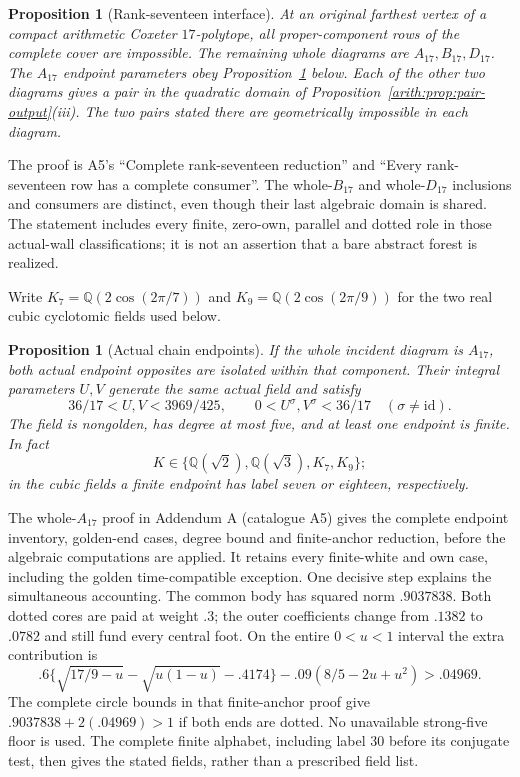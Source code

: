\documentclass[11pt]{article}
\newtheorem{proposition}[theorem]{Proposition}
\theoremstyle{remark}\newtheorem{remark}[theorem]{Remark}
\numberwithin{equation}{section}
\newcommand{\Q}{\mathbb Q}
\begin{document}
\begin{proposition}[Rank-seventeen interface]\label{arith:prop:f17}
At an original farthest vertex of a compact arithmetic Coxeter
$17$-polytope, all proper-component rows of the complete cover are
impossible. The remaining whole diagrams are $A_{17},B_{17},D_{17}$.
The $A_{17}$ endpoint parameters obey Proposition~\ref{arith:prop:a17reduce}
below. Each of the other two diagrams gives a pair in the quadratic
domain of Proposition~\ref{arith:prop:pair-output}(iii).
The two pairs stated there are geometrically impossible in each diagram.
\end{proposition}
The proof is A5's ``Complete rank-seventeen reduction'' and ``Every
rank-seventeen row has a complete consumer''. The whole-$B_{17}$ and
whole-$D_{17}$ inclusions and consumers are distinct, even though their
last algebraic domain is shared. The statement includes every finite,
zero-own, parallel and dotted role in those actual-wall classifications;
it is not an assertion that a bare abstract forest is realized.

Write $K_7=\Q(2\cos(2\pi/7))$ and $K_9=\Q(2\cos(2\pi/9))$
for the two real cubic cyclotomic fields used below.
\begin{proposition}[Actual chain endpoints]\label{arith:prop:a17reduce}
If the whole incident diagram is $A_{17}$, both actual endpoint
opposites are isolated within that component. Their integral parameters $U,V$ generate the same actual
field and satisfy
 \begin{equation}\label{eq:a17strip}
 36/17<U,V<3969/425,\qquad
 0<U^\sigma,V^\sigma<36/17\quad(\sigma\ne\mathrm{id}).
\end{equation}
The field is nongolden, has degree at most five, and at least one
endpoint is finite. In fact
 \[
 K\in\{\Q(\sqrt2),\Q(\sqrt3),K_7,K_9\};
\]
in the cubic fields a finite endpoint has label seven or eighteen,
respectively.
\end{proposition}
The whole-$A_{17}$ proof in Addendum A (catalogue A5) gives the complete
endpoint inventory, golden-end cases, degree bound and finite-anchor
reduction, before the algebraic computations are applied.
It retains every finite-white and own case, including the golden
time-compatible exception.
One decisive step explains the simultaneous accounting.
The common body has squared norm $.9037838$. Both dotted cores
are paid at weight $.3$; the outer coefficients change from
 $.1382$ to $.0782$ and still fund every central foot.
On the entire $0<u<1$ interval the extra contribution is
 \[
 .6\{\sqrt{17/9-u}-\sqrt{u(1-u)}-.4174\}
 -.09(8/5-2u+u^2)>.04969.
\]
The complete circle bounds in that finite-anchor proof give
 $.9037838+2(.04969)>1$ if both ends are dotted.
No unavailable strong-five floor is used.
The complete finite alphabet, including label $30$ before its conjugate
test, then gives the stated fields, rather than a prescribed field list.
\end{document}
